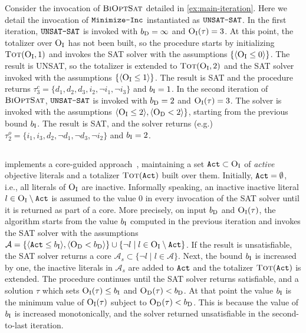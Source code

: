 \begin{example}
Consider the invocation of $\textsc{BiOptSat}$ detailed in \cref{ex:main-iteration}. 
Here we detail the invocation of $\texttt{Minimize-\allowbreak{}Inc}$ instantiated as $\texttt{UNSAT-SAT}$.
In the first iteration, $\texttt{UNSAT-SAT}$ is invoked with $b_{\text{D}} =\infty$ and $\textsc{O}_{\text{I}}(\tau) = 3$.
At this point, the totalizer over $\textsc{O}_{\text{I}}$ has not been built, so the procedure starts by initializing $\textsc{Tot}(\textsc{O}_{\text{I}}, 1)$ and invokes the SAT solver with the assumptions $\{\langle \textsc{O}_{\text{I}} \leq 0 \rangle\}$.
The result is UNSAT, so the totalizer is extended to $\textsc{Tot}(\textsc{O}_{\text{I}}, 2)$ and the SAT solver invoked with the assumptions $\{ \langle \textsc{O}_{\text{I}} \leq 1 \rangle\}$. The result is SAT and the procedure returns 
$\tau^c_3 = \{ d_1,  d_2, d_3, i_2, \lnot i_1, \lnot i_3\}$ and $b_{\text{I}} = 1$. 
In the second iteration of $\textsc{BiOptSat}$, $\texttt{UNSAT-SAT}$ is invoked with $b_{\text{D}} = 2$ and $\textsc{O}_{\text{I}}(\tau) = 3$.
The solver is invoked with the assumptions $\langle \textsc{O}_{\text{I}} \leq 2 \rangle, \langle \textsc{O}_{\text{D}} < 2 \rangle\}$, starting from the previous bound $b_{\text{I}}$.
The result is SAT, and the solver returns (e.g.)\ $\tau^o_2 = \{ i_1, i_3, d_2, \lnot d_1, \lnot d_3, \lnot i_2\}$
and $b_{\text{I}} = 2$.
\end{example}

\subsection{\msu{}\label{sec:msu3}}

\msu{} implements a core-guided approach~\autocite{DBLP:journals/corr/abs-0712-1097,DBLP:conf/sat/AnsoteguiBL09}, 
maintaining a set $\texttt{Act} \subset \textsc{O}_{\text{I}}$ of \emph{active} objective literals and a totalizer $\textsc{Tot}(\texttt{Act})$ built over them. 
Initially, $\texttt{Act} = \emptyset$, i.e., all literals of $\textsc{O}_{\text{I}}$ are inactive. Informally speaking, an inactive inactive literal $l \in \textsc{O}_{\text{I}} \setminus \texttt{Act}$ is assumed to the value $0$ in every invocation of the SAT 
solver until it is returned as part of a core. %
More precisely, on input $b_{\text{D}}$ and $\textsc{O}_{\text{I}}(\tau)$, the algorithm starts from the value $b_{\text{I}}$ 
computed in the previous iteration and invokes the SAT solver with the assumptions $\mathcal{A} = \{\langle \texttt{Act} \leq b_{\text{I}} \rangle, \langle \textsc{O}_{\text{D}} < b_{\text{D}} \rangle  \} \cup \{ \lnot l \mid l \in \textsc{O}_{\text{I}} \setminus \texttt{Act}\}$. If the result is 
unsatisfiable, the SAT solver returns a core $\mathcal{A}_s \subset \{\lnot l \mid l \in \mathcal{A}\}$. Next, the bound $b_{\text{I}}$ is increased by one, the inactive 
literals in $\mathcal{A}_s$ are added to $\texttt{Act}$ and the totalizer $\textsc{Tot}(\texttt{Act})$ is extended. The procedure continues until the 
SAT solver returns satisfiable, and a solution $\tau$ which sets $\textsc{O}_{\text{I}}(\tau) \leq b_{\text{I}}$ and $\textsc{O}_{\text{D}}(\tau) < b_{\text{D}}$. At that point the value $b_{\text{I}}$ is the minimum value of $\textsc{O}_{\text{I}}(\tau)$ subject to $\textsc{O}_{\text{D}}(\tau) < b_{\text{D}}$. This is because
the value of $b_{\text{I}}$ is increased monotonically, and the solver returned unsatisfiable in the second-to-last iteration. 


